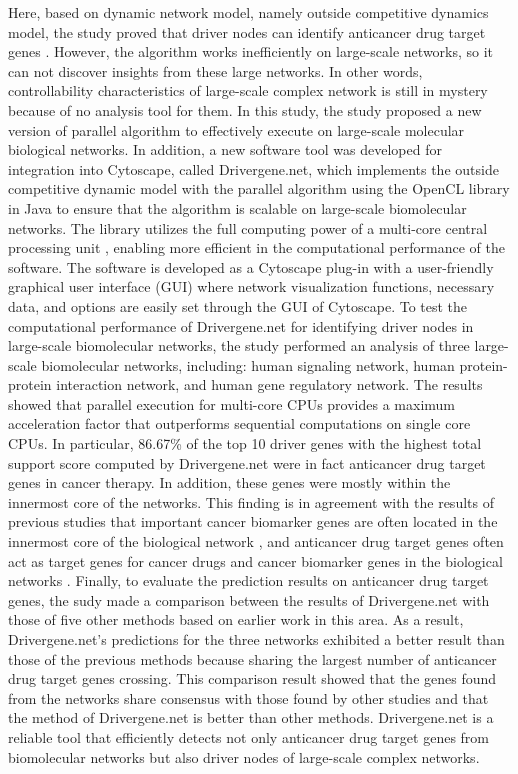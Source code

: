\documentclass[5p,,preprint,12pt]{elsarticle}
\begin{document}
Here, based on dynamic network model, namely outside competitive dynamics model, the study proved that driver nodes can identify anticancer drug target genes \cite{5}. However, the algorithm works inefficiently on large-scale networks, so it can not discover insights from these large networks. In other words, controllability characteristics of large-scale complex network is still in mystery because of no analysis tool for them. In this study, the study proposed a new version of parallel algorithm to effectively execute on large-scale molecular biological networks. In addition, a new software tool was developed for integration into Cytoscape, called Drivergene.net, which implements the outside competitive dynamic model with the parallel algorithm using the OpenCL library in Java to ensure that the algorithm is scalable on large-scale biomolecular networks. The library utilizes the full computing power of a multi-core central processing unit \cite{29,30}, enabling more efficient in the computational performance of the software. The software is developed as a Cytoscape plug-in with a user-friendly graphical user interface (GUI) where network visualization functions, necessary data, and options are easily set through the GUI of Cytoscape. To test the computational performance of Drivergene.net for identifying driver nodes in large-scale biomolecular networks, the study performed an analysis of three large-scale biomolecular networks, including: human signaling network, human protein-protein interaction network, and human gene regulatory network. The results showed that parallel execution for multi-core CPUs provides a maximum acceleration factor that outperforms sequential computations on single core CPUs. In particular, 86.67\% of the top 10 driver genes with the highest total support score computed by Drivergene.net were in fact anticancer drug target genes in cancer therapy. In addition, these genes were mostly within the innermost core of the networks. This finding is in agreement with the results of previous studies that important cancer biomarker genes are often located in the innermost core of the biological network \cite{31,32,33,34}, and anticancer drug target genes often act as target genes for cancer drugs and cancer biomarker genes in the biological networks \cite{23}. Finally, to evaluate the prediction results on anticancer drug target genes, the sudy made a comparison between the results of Drivergene.net with those of five other methods based on earlier work in this area. As a result, Drivergene.net's predictions for the three networks exhibited a better result than those of the previous methods because sharing the largest number of anticancer drug target genes crossing. This comparison result showed that the genes found from the networks share consensus with those found by other studies and that the method of Drivergene.net is better than other methods. Drivergene.net is a reliable tool that efficiently detects not only anticancer drug target genes from biomolecular networks but also driver nodes of large-scale complex networks.
\end{document}
